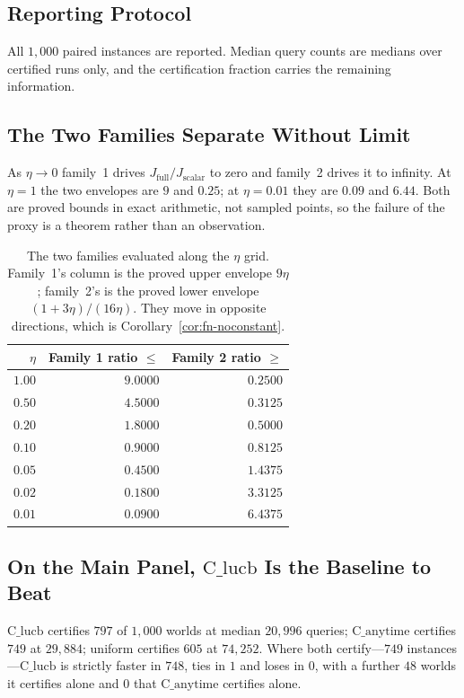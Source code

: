 \subsection{Reporting Protocol}

All $1{,}000$ paired instances are reported. Median query counts are medians over certified
runs only, and the certification fraction carries the remaining information.

\subsection{The Two Families Separate Without Limit}

As $\eta\to0$ family~1 drives $J_{\mathrm{full}}/J_{\mathrm{scalar}}$ to zero and family~2
drives it to infinity. At $\eta=1$ the two envelopes are $9$ and $0.25$; at $\eta=0.01$ they
are $0.09$ and $6.44$. Both are proved bounds in exact arithmetic, not sampled points, so the
failure of the proxy is a theorem rather than an observation.

\begin{table}[htbp]
\caption{The two families evaluated along the $\eta$ grid. Family~1's column is the proved
upper envelope $9\eta$; family~2's is the proved lower envelope $(1+3\eta)/(16\eta)$. They
move in opposite directions, which is Corollary~\ref{cor:fn-noconstant}.}
\label{tab:fn-families}
\centering
\footnotesize
\begin{tabular}{@{}rrr@{}}
\toprule
$\eta$ & Family 1 ratio $\le$ & Family 2 ratio $\ge$ \\
\midrule
$1.00$ & $9.0000$ & $0.2500$ \\
$0.50$ & $4.5000$ & $0.3125$ \\
$0.20$ & $1.8000$ & $0.5000$ \\
$0.10$ & $0.9000$ & $0.8125$ \\
$0.05$ & $0.4500$ & $1.4375$ \\
$0.02$ & $0.1800$ & $3.3125$ \\
$0.01$ & $0.0900$ & $6.4375$ \\
\bottomrule
\end{tabular}
\end{table}

\subsection{On the Main Panel, $\mathrm{C\_lucb}$ Is the Baseline to Beat}

$\mathrm{C\_lucb}$ certifies $797$ of $1{,}000$ worlds at median $20{,}996$ queries;
$\mathrm{C\_anytime}$ certifies $749$ at $29{,}884$; uniform certifies $605$ at $74{,}252$.
Where both certify---$749$ instances---$\mathrm{C\_lucb}$ is strictly faster in $748$, ties
in $1$ and loses in $0$, with a further $48$ worlds it certifies alone and $0$ that
$\mathrm{C\_anytime}$ certifies alone.

